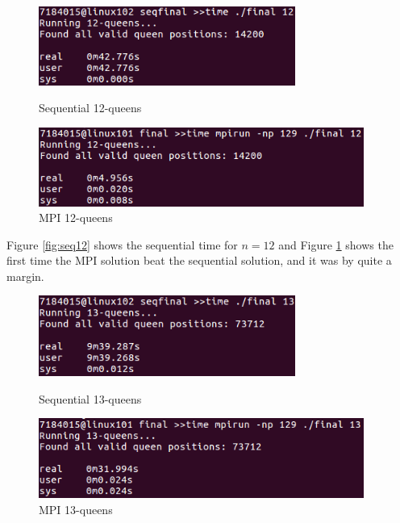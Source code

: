 \documentclass{article}
\begin{document}
\begin{figure}[h]
    \centering
    \begin{minipage}{0.49\textwidth}
        \centering
        \includegraphics[width=0.75\textwidth]{images/MPI_2_12}
        \caption{Sequential 12-queens}
        \label{fig:seq12}
    \end{minipage}\hfill
    \begin{minipage}{0.49\textwidth}
        \centering
        \includegraphics[width=0.95\textwidth]{images/MPI_12}
        \caption{MPI 12-queens}
        \label{fig:mpi12}
    \end{minipage}
\end{figure}

Figure \ref{fig:seq12} shows the sequential time for $n=12$ and Figure 
\ref{fig:mpi12} shows the first time the MPI solution beat the sequential 
solution, and it was by quite a margin.

\begin{figure}[h]
    \centering
    \begin{minipage}{0.49\textwidth}
        \centering
        \includegraphics[width=0.75\textwidth]{images/MPI_2_13}
        \caption{Sequential 13-queens}
        \label{fig:seq13}
    \end{minipage}\hfill
    \begin{minipage}{0.49\textwidth}
        \centering
        \includegraphics[width=0.95\textwidth]{images/MPI_13}
        \caption{MPI 13-queens}
        \label{fig:mpi13}
    \end{minipage}
\end{figure}
\end{document}
